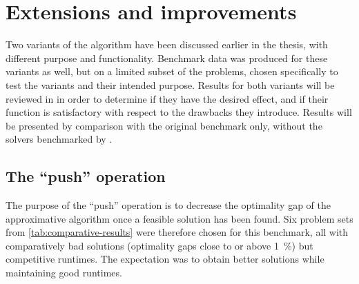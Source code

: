 \section{Extensions and improvements}
Two variants of the algorithm have been discussed earlier in the thesis, with different purpose and functionality.
Benchmark data was produced for these variants as well, but on a limited subset of the problems, chosen specifically to test the variants and their intended purpose.
Results for both variants will be reviewed in in order to determine if they have the desired effect, and if their function is satisfactory with respect to the drawbacks they introduce.
Results will be presented by comparison with the original benchmark only, without the solvers benchmarked by \textcite{deGivry14}.


\subsection{The \enquote{push} operation}
The purpose of the \enquote{push} operation is to decrease the optimality gap of the approximative algorithm once a feasible solution has been found.
Six problem sets from \cref{tab:comparative-results} were therefore chosen for this benchmark, all with comparatively bad solutions (optimality gaps close to or above \SI{1}{\percent}) but competitive runtimes.
The expectation was to obtain better solutions while maintaining good runtimes.

